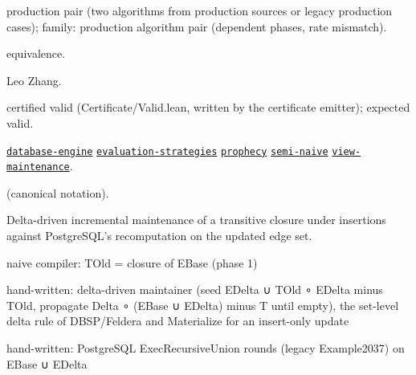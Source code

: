\documentclass[10pt]{article}
\begin{document}
\begin{description}[leftmargin=2.6cm,style=nextline,itemsep=1pt]

\item[Category] production pair (two algorithms from production sources or legacy production cases); family: production algorithm pair (dependent phases, rate mismatch).

\item[Kind] equivalence.

\item[Contributors] Leo Zhang.

\item[Status] certified valid (Certificate/Valid.lean, written by the certificate emitter); expected valid.

\item[Tags] \hyperref[tag:database-engine]{\texttt{database-engine}} \hyperref[tag:evaluation-strategies]{\texttt{evaluation-strategies}} \hyperref[tag:prophecy]{\texttt{prophecy}} \hyperref[tag:semi-naive]{\texttt{semi-naive}} \hyperref[tag:view-maintenance]{\texttt{view-maintenance}}.

\item[Input]  (canonical notation).

\item[Summary] Delta-driven incremental maintenance of a transitive closure under insertions against PostgreSQL's recomputation on the updated edge set.

\item[Sides] naive compiler: TOld = closure of EBase (phase 1) \par hand-written: delta-driven maintainer (seed EDelta ∪ TOld ∘ EDelta minus TOld, propagate Delta ∘ (EBase ∪ EDelta) minus T until empty), the set-level delta rule of DBSP/Feldera and Materialize for an insert-only update \par hand-written: PostgreSQL ExecRecursiveUnion rounds (legacy Example2037) on EBase ∪ EDelta


\end{description}
\end{document}
